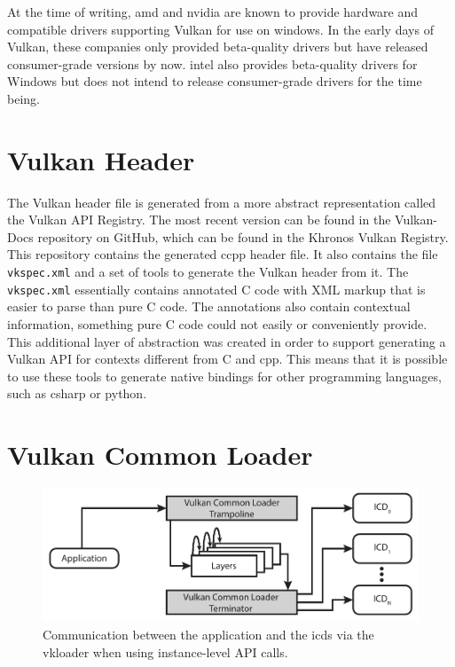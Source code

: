 
    At the time of writing, \gls{amd} and \gls{nvidia} are known to provide hardware and compatible drivers supporting Vulkan for use on \gls{windows}.
    In the early days of Vulkan, these companies only provided beta-quality \glspl{driver} but have released consumer-grade versions by now.
    \gls{intel} also provides beta-quality drivers for Windows but does not intend to release consumer-grade \glspl{driver} for the time being\cite{intelvulkandriversonwindows}.

  \section{Vulkan Header}
  \label{sec:VulkanHeader}
    The Vulkan header file is generated from a more abstract representation called the Vulkan API Registry.
    The most recent version can be found in the Vulkan-Docs repository on GitHub, which can be found in the Khronos Vulkan Registry\cite{vulkanregistry}.
    This repository contains the generated \gls{ccpp} header file.
    It also contains the file \lstinline{vkspec.xml} and a set of tools to generate the Vulkan header from it.
    The \lstinline{vkspec.xml} essentially contains annotated C code with XML markup that is easier to parse than pure C code.
    The annotations also contain contextual information, something pure C code could not easily or conveniently provide.
    This additional layer of abstraction was created in order to support generating a Vulkan API for contexts different from C and \gls{cpp}.
    This means that it is possible to use these tools to generate native bindings for other programming languages, such as \gls{csharp} or \gls{python}.


  \section{Vulkan Common Loader}
  \label{sec:VulkanLoader}

    \begin{figure}
      \includegraphics{Main/Images/VulkanLoaderInstanceLayers}
      \centering
      \caption{Communication between the application and the \glspl{icd} via the \gls{vkloader} when using instance-level API calls.}
      \label{fig:VulkanLoaderWithInstanceLayers}
    \end{figure}

